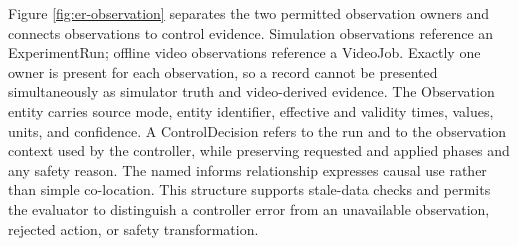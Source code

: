 Figure \ref{fig:er-observation} separates the two permitted observation owners and connects observations to control evidence. Simulation observations reference an ExperimentRun; offline video observations reference a VideoJob. Exactly one owner is present for each observation, so a record cannot be presented simultaneously as simulator truth and video-derived evidence. The Observation entity carries source mode, entity identifier, effective and validity times, values, units, and confidence. A ControlDecision refers to the run and to the observation context used by the controller, while preserving requested and applied phases and any safety reason. The named informs relationship expresses causal use rather than simple co-location. This structure supports stale-data checks and permits the evaluator to distinguish a controller error from an unavailable observation, rejected action, or safety transformation.


